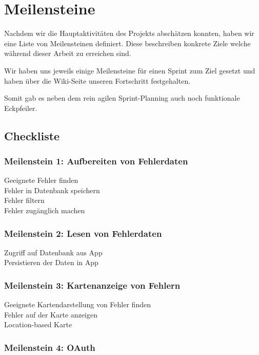 \section{Meilensteine}
\label{meilensteine}

Nachdem wir die Hauptaktivitäten des Projekts abschätzen konnten, haben wir eine Liste von Meilensteinen definiert.
Diese beschreiben konkrete Ziele welche während dieser Arbeit zu erreichen sind.

Wir haben uns jeweils einige Meilensteine für einen Sprint zum Ziel gesetzt und haben über die Wiki-Seite unseren Fortschritt festgehalten.

Somit gab es neben dem rein agilen Sprint-Planning auch noch funktionale Eckpfeiler.

\subsection{Checkliste}
\subsubsection{Meilenstein 1: Aufbereiten von Fehlerdaten}
\tick Geeignete Fehler finden \\
\tick Fehler in Datenbank speichern \\
\tick Fehler filtern \\
\tick Fehler zugänglich machen

\subsubsection{Meilenstein 2: Lesen von Fehlerdaten}

\tick Zugriff auf Datenbank aus App \\
\tick Persistieren der Daten in App

\subsubsection{Meilenstein 3: Kartenanzeige von Fehlern}

\tick Geeignete Kartendarstellung von Fehler finden \\
\tick Fehler auf der Karte anzeigen \\
\tick Location-based Karte

\subsubsection{Meilenstein 4: OAuth}


